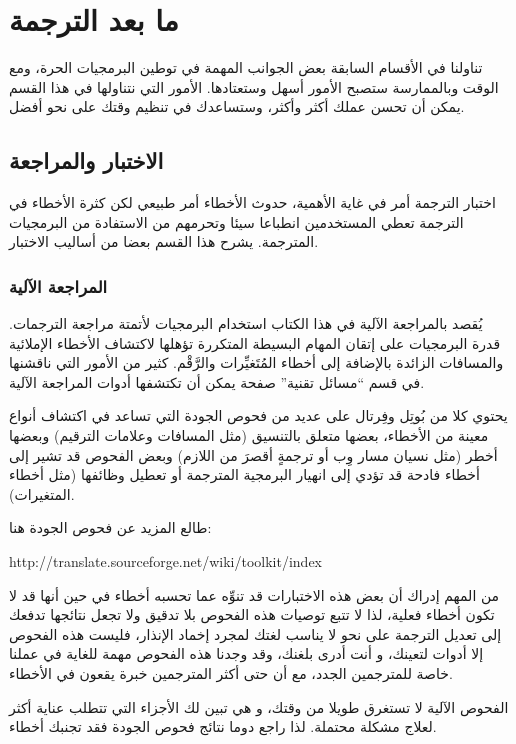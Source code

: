 \chapter{ما بعد الترجمة}
تناولنا في الأقسام السابقة بعض الجوانب المهمة في توطين البرمجيات الحرة،
ومع الوقت وبالممارسة ستصبح الأمور أسهل وستعتادها. الأمور التي نتناولها
في هذا القسم يمكن أن تحسن عملك أكثر وأكثر، وستساعدك في تنظيم وقتك على
نحو أفضل.

\section{الاختبار والمراجعة}
اختبار الترجمة أمر في غاية
الأهمية، حدوث الأخطاء أمر طبيعي لكن كثرة الأخطاء في الترجمة تعطي
المستخدمين انطباعا سيئا وتحرمهم من الاستفادة من البرمجيات المترجمة.
يشرح هذا القسم بعضا من أساليب الاختبار.

\subsection{المراجعة الآلية}
يُقصد بالمراجعة الآلية في هذا
الكتاب استخدام البرمجيات لأتمتة مراجعة الترجمات. قدرة البرمجيات على
إتقان المهام البسيطة المتكررة تؤهلها لاكتشاف الأخطاء الإملائية
والمسافات الزائدة بالإضافة إلى أخطاء المُتَغيِّرات والرَّقْم. كثير من
الأمور التي ناقشنها في قسم “مسائل تقنية” صفحة
 يمكن أن تكتشفها أدوات المراجعة الآلية.

يحتوي كلا من بُوتِل وفِرتال على عديد من فحوص الجودة التي تساعد في اكتشاف
أنواع معينة من الأخطاء، بعضها متعلق بالتنسيق (مثل المسافات وعلامات
الترقيم) وبعضها أخطر (مثل نسيان مسار وِب أو ترجمةٍ أقصرَ من اللازم)
وبعض الفحوص قد تشير إلى أخطاء فادحة قد تؤدي إلى انهيار البرمجية
المترجمة أو تعطيل وظائفها (مثل أخطاء المتغيرات).

طالع المزيد عن فحوص الجودة هنا:

http://translate.sourceforge.net/wiki/toolkit/index

من المهم إدراك أن بعض هذه الاختبارات قد تنوِّه عما تحسبه أخطاء في حين
أنها قد لا تكون أخطاء فعلية، لذا لا تتبع توصيات هذه الفحوص بلا تدقيق
ولا تجعل نتائجها تدفعك إلى تعديل الترجمة على نحو لا يناسب لغتك لمجرد
إخماد الإنذار، فليست هذه الفحوص إلا أدوات لتعينك، و أنت أدرى بلغنك، وقد
وجدنا هذه الفحوص مهمة للغاية في عملنا خاصة للمترجمين الجدد، مع أن حتى
أكثر المترجمين خبرة يقعون في الأخطاء.

الفحوص الآلية لا تستغرق طويلا من وقتك، و هي تبين لك الأجزاء التي تتطلب
عناية أكثر لعلاج مشكلة محتملة. لذا راجع دوما نتائج فحوص الجودة فقد
تجنبك أخطاء.

